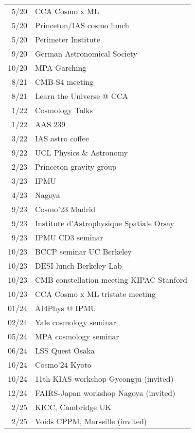 \begin{tabular}{r l}
 5/20 & CCA Cosmo x ML \\
 5/20 & Princeton/IAS cosmo lunch \\
 5/20 & Perimeter Institute \\
 9/20 & German Astronomical Society \\
10/20 & MPA Garching \\
 8/21 & CMB-S4 meeting \\
 8/21 & Learn the Universe @ CCA \\
 1/22 & Cosmology Talks \\
 1/22 & AAS 239 \\
 3/22 & IAS astro coffee \\
 9/22 & UCL Physics \& Astronomy \\
 2/23 & Princeton gravity group \\
 3/23 & IPMU \\
 4/23 & Nagoya \\
 9/23 & Cosmo'23 Madrid \\
 9/23 & Institute d'Astrophysique Spatiale Orsay \\
 9/23 & IPMU CD3 seminar \\
10/23 & BCCP seminar UC Berkeley \\
10/23 & DESI lunch Berkeley Lab \\
10/23 & CMB constellation meeting KIPAC Stanford \\
10/23 & CCA Cosmo x ML tristate meeting \\
01/24 & AI4Phys @ IPMU \\
02/24 & Yale cosmology seminar \\
05/24 & MPA cosmology seminar \\
06/24 & LSS Quest Osaka \\
10/24 & Cosmo'24 Kyoto \\
10/24 & 11th KIAS workshop Gyeongju (invited) \\
12/24 & FAIRS-Japan workshop Nagoya (invited) \\
 2/25 & KICC, Cambridge UK \\
 2/25 & Voids \@ CPPM, Marseille (invited) \\
\end{tabular}
